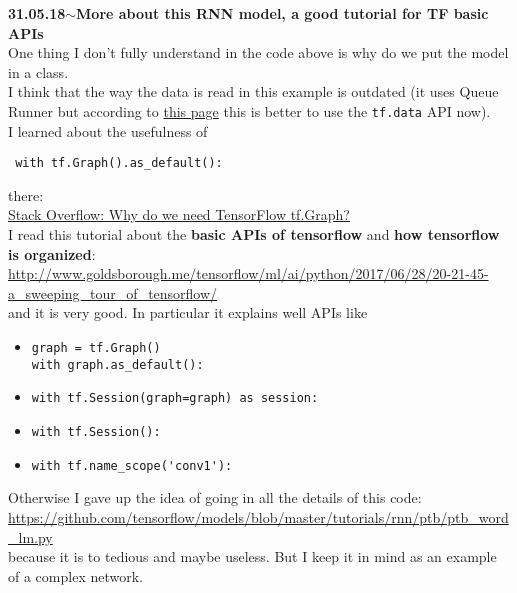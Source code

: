 \documentclass[11pt,a4paper]{article}
\newenvironment{loggentry}[2]%
{\noindent\textbf{#1}\hspace{1cm}$\mathbf{\sim}$\text{ }\textbf{#2}\\}{\vspace{0.5cm}}
\begin{document}
\begin{loggentry}{31.05.18}{More about this RNN model, a good tutorial for TF basic APIs}
One thing I don't fully understand in the code above is why do we put the model in a class.\\
I think that the way the data is read in this example is outdated (it uses Queue Runner but according to \href{https://www.tensorflow.org/api_guides/python/reading_data}{this page} this is better to use the \texttt{tf.data} API now).\\
I learned about the usefulness of
\begin{verbatim}
 with tf.Graph().as_default():
\end{verbatim}
there:\\
\href{https://stackoverflow.com/questions/39614938/why-do-we-need-tensorflow-tf-graph#39616491}{Stack Overflow: Why do we need TensorFlow tf.Graph?}\\
I read this tutorial about the \textbf{basic APIs of tensorflow} and \textbf{how tensorflow is organized}:\\
\url{http://www.goldsborough.me/tensorflow/ml/ai/python/2017/06/28/20-21-45-a_sweeping_tour_of_tensorflow/}\\
and it is very good. In particular it explains well APIs like
\begin{itemize}
\item \begin{verbatim}
graph = tf.Graph()
with graph.as_default():
\end{verbatim}
\item \begin{verbatim}
with tf.Session(graph=graph) as session:
\end{verbatim}
\item \begin{verbatim}
with tf.Session():
\end{verbatim}
\item \begin{verbatim}
with tf.name_scope('conv1'):
\end{verbatim}
\end{itemize}

Otherwise I gave up the idea of going in all the details of this code:\\
\url{https://github.com/tensorflow/models/blob/master/tutorials/rnn/ptb/ptb_word_lm.py}\\
because it is to tedious and maybe useless. But I keep it in mind as an example of a complex network.
\end{loggentry}
\end{document}
